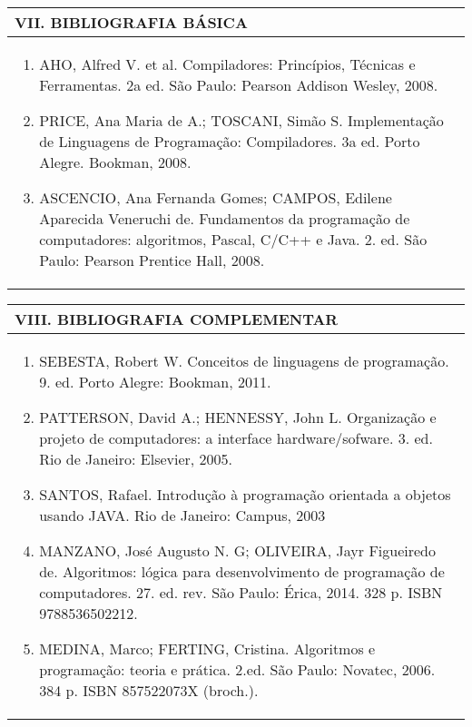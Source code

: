 \documentclass[12pt]{article}
\begin{document}
\begin{longtable}{|L{1.025\textwidth}|} \hline
%
{\bf VII. BIBLIOGRAFIA BÁSICA} \\ \hline

\begin{enumerate}
\item AHO, Alfred V. et al. Compiladores: Princípios, Técnicas e Ferramentas. 2a ed. São Paulo: Pearson Addison Wesley, 2008. 
\item PRICE, Ana Maria de A.; TOSCANI, Simão S. Implementação de Linguagens de Programação: Compiladores. 3a ed. Porto Alegre. Bookman, 2008. 
\item ASCENCIO, Ana Fernanda Gomes; CAMPOS, Edilene Aparecida Veneruchi de. Fundamentos da programação de computadores: algoritmos, Pascal, C/C++ e Java. 2. ed. São Paulo: Pearson Prentice Hall, 2008.
\end{enumerate}

 \\ \hline
\end{longtable}



\begin{longtable}{|L{1.025\textwidth}|} \hline
%
{\bf VIII. BIBLIOGRAFIA COMPLEMENTAR} \\ \hline
\begin{enumerate}
\item SEBESTA, Robert W. Conceitos de linguagens de programação. 9. ed. Porto Alegre: Bookman, 2011. 
\item  PATTERSON, David A.; HENNESSY, John L. Organização e projeto de computadores: a interface hardware/sofware. 3. ed. Rio de Janeiro: Elsevier, 2005. 
\item  SANTOS, Rafael. Introdução à programação orientada a objetos usando JAVA. Rio de Janeiro: Campus, 2003
%
\item MANZANO, José Augusto N. G; OLIVEIRA, Jayr Figueiredo de. Algoritmos: lógica para desenvolvimento de programação de computadores. 27. ed. rev. São Paulo: Érica, 2014. 328 p. ISBN 9788536502212.
\item MEDINA, Marco; FERTING, Cristina. Algoritmos e programação: teoria e prática. 2.ed. São Paulo: Novatec, 2006. 384 p. ISBN 857522073X (broch.).
\end{enumerate}
 \\ \hline
\end{longtable}



\end{document}
